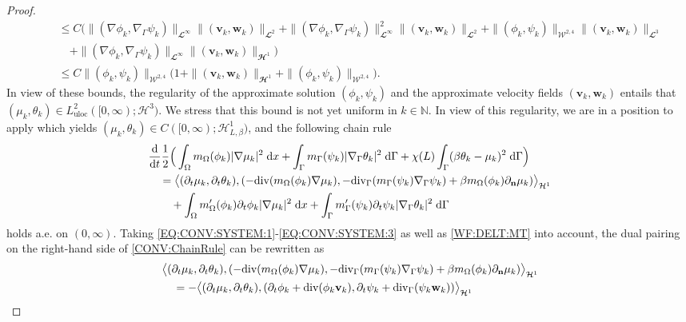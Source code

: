 \documentclass[10pt,reqno]{amsart}
\theoremstyle{remark}
\numberwithin{equation}{section}
\newcommand{\abs}[1]{| #1 |}
\newcommand{\norm}[1]{\| #1 \|}
\newcommand{\bigang}[2]{ \big< #1 , #2  \big>}
\newcommand{\N}{\mathbb N}
\newcommand{\n}{\mathbf{n}}
\newcommand{\bv}{\mathbf{v}}
\newcommand{\bw}{\mathbf{w}}
\newcommand{\intO}{\int_\Omega}
\newcommand{\intG}{\int_\Gamma}
\newcommand{\dx}{\;\mathrm{d}x}
\newcommand{\dG}{\;\mathrm d\Ga}
\newcommand{\ddt}{\frac{\mathrm d}{\mathrm dt}}
\newcommand{\delt}{\partial_{t}}
\newcommand{\deln}{\partial_\n}
\newcommand{\Grad}{\nabla}
\newcommand{\Div}{\textnormal{div}}
\newcommand{\Gradg}{\nabla_\Ga}
\newcommand{\Divg}{\textnormal{div}_\Ga}
\newcommand{\Om}{\Omega}
\newcommand{\Ga}{\Gamma}
\begin{document}
\begin{proof}
\begin{align}
    &\quad\leq C\big(\norm{(\Grad\phi_k,\Gradg\psi_k)}_{\mathbfcal{L}^\infty}\norm{(\bv_k,\bw_k)}_{\mathbfcal{L}^2} + \norm{(\Grad\phi_k,\Gradg\psi_k)}_{\mathbfcal{L}^\infty}^2\norm{(\bv_k,\bw_k)}_{\mathbfcal{L}^2} + \norm{(\phi_k,\psi_k)}_{\mathcal{W}^{2,4}}\norm{(\bv_k,\bw_k)}_{\mathbfcal{L}^3} \nonumber \\
    &\qquad + \norm{(\Grad\phi_k,\Gradg\psi_k)}_{\mathbfcal{L}^\infty}\norm{(\bv_k,\bw_k)}_{\mathbfcal{H}^1}\big) \nonumber \\
    &\quad\leq C\norm{(\phi_k,\psi_k)}_{\mathcal{W}^{2,4}}\big(1 + \norm{(\bv_k,\bw_k)}_{\mathbfcal{H}^1} + \norm{(\phi_k,\psi_k)}_{\mathcal{W}^{2,4}}\big). \nonumber
\end{align}
In view of these bounds, the regularity of the approximate solution $(\phi_k,\psi_k)$ and the approximate velocity fields $(\bv_k,\bw_k)$ entails that $(\mu_k,\theta_k)\in L^2_{\mathrm{uloc}}([0,\infty);\mathcal{H}^3)$. We stress that this bound is not yet uniform in $k\in\N$. In view of this regularity, we are in a position to apply \cite[Proposition~A.1]{Stange2025} which yields $(\mu_k,\theta_k)\in C([0,\infty);\mathcal{H}^1_{L,\beta})$, and the following chain rule
\begin{align}\label{CONV:ChainRule}
    &\ddt\frac12\Big(\intO m_\Om(\phi_k)\abs{\Grad\mu_k}^2\dx + \intG m_\Ga(\psi_k)\abs{\Gradg\theta_k}^2\dG + \chi(L)\intG (\beta\theta_k - \mu_k)^2\dG \Big) \nonumber \\
    &\quad = \bigang{(\delt\mu_k,\delt\theta_k)}{(-\Div(m_\Om(\phi_k)\Grad\mu_k),-\Divg(m_\Ga(\psi_k)\Gradg\psi_k) + \beta m_\Om(\phi_k)\deln\mu_k)}_{\mathcal{H}^1} \\
    &\qquad + \intO m_\Om^\prime(\phi_k)\delt\phi_k\abs{\Grad\mu_k}^2\dx + \intG m_\Ga^\prime(\psi_k)\delt\psi_k\abs{\Gradg\theta_k}^2\dG \nonumber
\end{align}
holds a.e. on $(0,\infty)$. Taking \eqref{EQ:CONV:SYSTEM:1}-\eqref{EQ:CONV:SYSTEM:3} as well as \eqref{WF:DELT:MT} into account, the dual pairing on the right-hand side of \eqref{CONV:ChainRule} can be rewritten as
\begin{align}\label{CONV:ChainRule:Rewrite}
    \begin{split}
        &\bigang{(\delt\mu_k,\delt\theta_k)}{(-\Div(m_\Om(\phi_k)\Grad\mu_k),-\Divg(m_\Ga(\psi_k)\Gradg\psi_k) + \beta m_\Om(\phi_k)\deln\mu_k)}_{\mathcal{H}^1} \\
        &\quad = -\bigang{(\delt\mu_k,\delt\theta_k)}{(\delt\phi_k + \Div(\phi_k\mathbf{v}_k),\delt\psi_k + \Divg(\psi_k\mathbf{w}_k))}_{\mathcal{H}^1} \\

\end{split}
\end{align}
\end{proof}
\end{document}
